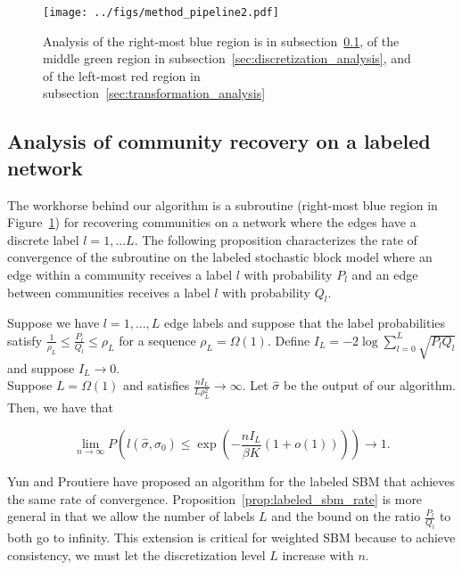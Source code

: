 \begin{figure}[htp]
\centering
\texttt{[image: ../figs/method\_pipeline2.pdf]}
\caption{Analysis of the right-most blue region is in subsection~\ref{sec:labeled_sbm_analysis}, of the middle green region in subsection~\ref{sec:discretization_analysis}, and of the left-most red region in subsection~\ref{sec:transformation_analysis}}
\label{fig:method_pipeline1}
\end{figure}


\subsection{Analysis of community recovery on a labeled network}
\label{sec:labeled_sbm_analysis}

The workhorse behind our algorithm is a subroutine (right-most blue region in Figure~\ref{fig:method_pipeline1}) for recovering communities on a network where the edges have a discrete label $l=1,...L$. The following proposition characterizes the rate of convergence of the subroutine on the labeled stochastic block model where an edge within a community receives a label $l$ with probability $P_l$ and an edge between communities receives a label $l$ with probability $Q_l$. 


\begin{proposition}
\label{prop:labeled_sbm_rate}
Suppose we have $l=1,...,L$ edge labels and suppose that the label probabilities satisfy $\frac{1}{\rho_L} \leq \frac{P_l}{Q_l} \leq \rho_L$ for a sequence $\rho_L = \Omega(1)$. Define $I_L = -2 \log \sum_{l=0}^L \sqrt{P_l Q_l}$ and suppose $I_L \rightarrow 0$.  \\

Suppose $L = \Omega(1)$ and satisfies $\frac{n I_L}{L \rho^2_L} \rightarrow \infty$. Let $\hat{\sigma}$ be the output of our algorithm. Then, we have that

\[
\lim_{n \rightarrow \infty} P \left( l(\hat{\sigma}, \sigma_0) \leq \exp \left( - \frac{ n I_L}{ \beta K} (1 + o(1)) \right) \right) \rightarrow 1.
\]
\end{proposition}

Yun and Proutiere \cite{yun2016optimal} have proposed an algorithm for the labeled SBM that achieves the same rate of convergence. Proposition~\ref{prop:labeled_sbm_rate} is more general in that we allow the number of labels $L$ and the bound on the ratio $\frac{P_l}{Q_l}$ to both go to infinity. This extension is critical for weighted SBM because to achieve consistency, we must let the discretization level $L$ increase with $n$. 


